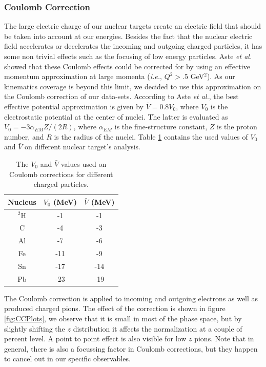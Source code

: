 \subsubsection{Coulomb Correction}
\label{CCor}

The large electric charge of our nuclear targets create an electric field that 
should be taken into account at our energies. Besides the fact that the nuclear 
electric field accelerates or decelerates the incoming and outgoing charged 
particles, it has some non trivial effects such as the focusing of low energy 
particles. Aste {\it et al.}~\cite{Aste:2005wc} showed that these Coulomb 
effects could be corrected for by using an effective momentum approximation at 
large momenta ({\it i.e.}, $Q^2>.5$ GeV$^2$). As our kinematics coverage is 
beyond this limit, we decided to use this approximation on the Coulomb 
correction of our data-sets. According to Aste {\it et al.}, the best effective 
potential approximation is given by $\bar V= 0.8 V_0$, where $V_0$ is the 
electrostatic potential at the center of nuclei. The latter is evaluated as 
$V_0= -3 \alpha_{EM} Z / (2 R)$, where $\alpha_{EM}$ is the fine-structure 
constant, $Z$ is the proton number, and $R$ is the radius of the nuclei. Table 
\ref{tab:Coulomb} contains the used values of $V_0$ and $\bar V$ on different 
nuclear target's analysis.

\begin{table}[htbp]
  \centering
  \begin{tabular}{@{} ccc @{}}
    \hline 
Nucleus & $V_0$ (MeV)  &  $\bar V$ (MeV) \\ \hline
$^2$H & -1 &   -1 \\
C   &  -4 &    -3 \\
Al  &  -7 &    -6 \\
Fe  & -11 &    -9 \\
Sn  & -17 &   -14 \\
Pb  & -23 &   -19 \\
    \hline
  \end{tabular}
  \caption{The $V_0$ and $\bar V$ values used on Coulomb corrections for different charged particles.}
  \label{tab:Coulomb}
\end{table}

The Coulomb correction is applied to incoming and outgoing electrons as well as
produced charged pions. The effect of the correction is shown in figure \ref{fig:CCPlots},
we observe that it is small in most of the phase space, but by slightly shifting 
the $z$ distribution it affects the normalization at a couple of percent level. A
point to point effect is also visible for low $z$ pions. Note that in general, there
is also a focussing factor in Coulomb corrections, but they happen to cancel out in
our specific observables.

